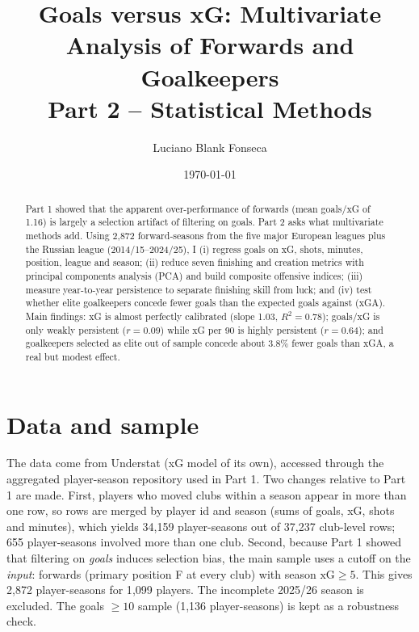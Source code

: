 \documentclass[11pt,a4paper]{article}
\title{Goals versus xG: Multivariate Analysis of Forwards and Goalkeepers\\
\large Part 2 -- Statistical Methods}
\author{Luciano Blank Fonseca}
\date{\today}
\begin{document}
\maketitle

\begin{abstract}
Part 1 showed that the apparent over-performance of forwards (mean goals/xG of 1.16) is largely a selection artifact of filtering on goals. Part 2 asks what multivariate methods add. Using 2{,}872 forward-seasons from the five major European leagues plus the Russian league (2014/15--2024/25), I (i) regress goals on xG, shots, minutes, position, league and season; (ii) reduce seven finishing and creation metrics with principal components analysis (PCA) and build composite offensive indices; (iii) measure year-to-year persistence to separate finishing skill from luck; and (iv) test whether elite goalkeepers concede fewer goals than the expected goals against (xGA). Main findings: xG is almost perfectly calibrated (slope 1.03, $R^2=0.78$); goals/xG is only weakly persistent ($r=0.09$) while xG per 90 is highly persistent ($r=0.64$); and goalkeepers selected as elite out of sample concede about 3.8\% fewer goals than xGA, a real but modest effect.
\end{abstract}

\section{Data and sample}

The data come from Understat (xG model of its own), accessed through the aggregated player-season repository used in Part 1. Two changes relative to Part 1 are made. First, players who moved clubs within a season appear in more than one row, so rows are merged by player id and season (sums of goals, xG, shots and minutes), which yields 34{,}159 player-seasons out of 37{,}237 club-level rows; 655 player-seasons involved more than one club. Second, because Part 1 showed that filtering on \emph{goals} induces selection bias, the main sample uses a cutoff on the \emph{input}: forwards (primary position F at every club) with season $\text{xG}\geq 5$. This gives 2{,}872 player-seasons for 1{,}099 players. The incomplete 2025/26 season is excluded. The goals $\geq 10$ sample (1{,}136 player-seasons) is kept as a robustness check.
\end{document}
